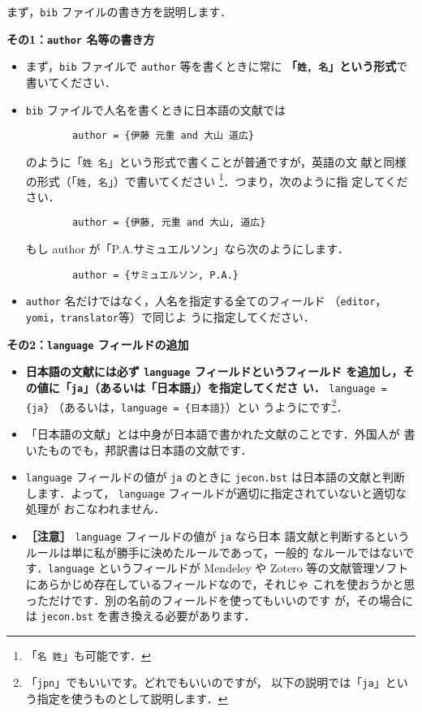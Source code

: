 \documentclass{ltjsarticle}
\begin{document}
まず，\texttt{bib} ファイルの書き方を説明します．
\vspace*{1em}

\textbf{その1：\texttt{author} 名等の書き方}
\begin{itemize}
 \item まず，\texttt{bib} ファイルで \texttt{author} 等を書くときに常に
       \textbf{「\texttt{姓,\ 名}」という形式}で書いてください．
 \item \texttt{bib} ファイルで人名を書くときに日本語の文献では
\begin{verbatim}
        author = {伊藤 元重 and 大山 道広}
\end{verbatim}
       のように「\verb|姓 名|」という形式で書くことが普通ですが，英語の文
       献と同様の形式（「\verb|姓, 名|」）で書いてください
       \footnote{「\texttt{名\ 姓}」も可能です．}．つまり，次のように指
       定してください．
\begin{verbatim}
        author = {伊藤, 元重 and 大山, 道広}
\end{verbatim}
       もし author が「P.A.サミュエルソン」なら次のようにします．
\begin{verbatim}
        author = {サミュエルソン, P.A.}
\end{verbatim}
 \item \texttt{author} 名だけではなく，人名を指定する全てのフィールド
       （\texttt{editor}，\texttt{yomi}，\texttt{translator}等）で同じよ
       うに指定してください．
\end{itemize}

\vspace*{1em}

\textbf{その2：\texttt{language} フィールドの追加}
\begin{itemize}
 \item \textbf{日本語の文献には必ず \texttt{language} フィールドというフィールド
       を追加し，その値に「\texttt{ja}」（あるいは「日本語」）を指定してくださ
       い．} \verb|language = {ja}| （あるいは，\verb|language = {日本語}|）とい
       うようにです\footnote{「\texttt{jpn}」でもいいです。どれでもいいのですが，
       以下の説明では「\texttt{ja}」という指定を使うものとして説明します．}．
 \item 「日本語の文献」とは中身が日本語で書かれた文献のことです．外国人が
       書いたものでも，邦訳書は日本語の文献です．
 \item \texttt{language} フィールドの値が \texttt{ja} のときに
       \texttt{jecon.bst} は日本語の文献と判断します．よって，
       \texttt{language} フィールドが適切に指定されていないと適切な処理が
       おこなわれません．
 \item \textbf{［注意］} \texttt{language} フィールドの値が \texttt{ja} なら日本
       語文献と判断するというルールは単に私が勝手に決めたルールであって，一般的
       なルールではないです．\texttt{language} というフィールドが Mendeley や
       Zotero 等の文献管理ソフトにあらかじめ存在しているフィールドなので，それじゃ
       これを使おうかと思っただけです．別の名前のフィールドを使ってもいいのです
       が，その場合には \texttt{jecon.bst} を書き換える必要があります．
\end{itemize}
\end{document}
